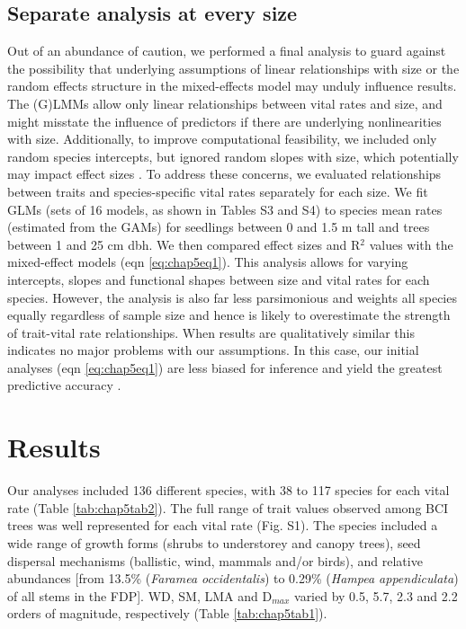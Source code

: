 \documentclass[b5paper,justified]{tufte-book} %
\begin{document}
\begin{fullwidth}
\subsection{Separate analysis at every size} 
Out of an abundance of caution, we performed a final analysis to guard against the possibility that underlying assumptions of linear relationships with size or the random effects structure in the mixed-effects model may unduly influence results. The (G)LMMs allow only linear relationships between vital rates and size, and might misstate the influence of predictors if there are underlying nonlinearities with size. Additionally, to improve computational
feasibility, we included only random species intercepts, but ignored random slopes with size, which potentially may impact effect sizes \citep{Schielzeth2009}. To address these concerns, we evaluated relationships between traits and species-specific vital rates separately for each size. We fit GLMs (sets of 16 models, as shown in Tables S3 and S4) to species mean rates (estimated from the GAMs) for seedlings between 0 and 1.5 m tall and trees between 1 and 25 cm dbh. We then compared effect sizes and R$^2$ values with the mixed-effect models (eqn \ref{eq:chap5eq1}). This analysis allows for varying intercepts, slopes and functional shapes between size and vital rates for each species. However, the analysis is also far less parsimonious and weights all species equally regardless of sample size and hence is likely to overestimate the strength of trait-vital rate relationships. When results are qualitatively similar this indicates no major problems with our assumptions. In this case, our initial analyses (eqn \ref{eq:chap5eq1}) are less biased for inference and yield the greatest predictive accuracy \citep{Gelman2006}.

\section{Results}
Our analyses included 136 different species, with 38 to 117 species for each vital rate (Table \ref{tab:chap5tab2}). The full range of trait values observed among BCI trees was well represented for each vital rate (Fig. S1). The species included a wide range of growth forms (shrubs to understorey and canopy trees), seed dispersal mechanisms (ballistic, wind, mammals and/or birds), and relative abundances [from 13.5\% (\textit{Faramea occidentalis}) to 0.29\% (\textit{Hampea appendiculata}) of all stems in the FDP]. WD, SM, LMA and D$_{max }$ varied by 0.5, 5.7, 2.3 and 2.2 orders of magnitude, respectively (Table \ref{tab:chap5tab1}).


\end{fullwidth}
\end{document}

